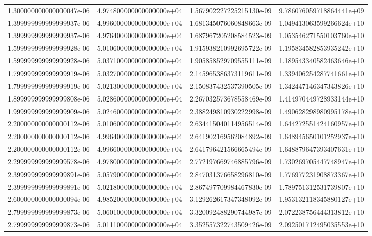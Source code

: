 \begin{table}
\begin{tabular}{S[scientific-notation=fixed,fixed-exponent = -6 ]@{\qquad} S[scientific-notation=fixed,fixed-exponent = 0, round-precision=0 ] S S[scientific-notation=fixed,fixed-exponent = 10 ]}
  1.300000000000000047e-06 & 4.974800000000000000e+04 & 1.567902227225215130e-09 & 9.786076059718864441e+09\\
  1.399999999999999937e-06 & 4.996000000000000000e+04 & 1.681345076060848663e-09 & 1.049413063599266624e+10\\
  1.399999999999999937e-06 & 4.976400000000000000e+04 & 1.687967205208584523e-09 & 1.053546271550103760e+10\\
  1.599999999999999928e-06 & 5.010600000000000000e+04 & 1.915938210992695722e-09 & 1.195834582853935242e+10\\
  1.599999999999999928e-06 & 5.037100000000000000e+04 & 1.905858529709555111e-09 & 1.189543340582463646e+10\\
  1.799999999999999919e-06 & 5.032700000000000000e+04 & 2.145965386373119611e-09 & 1.339406254287741661e+10\\
  1.799999999999999919e-06 & 5.021300000000000000e+04 & 2.150837432537390505e-09 & 1.342447146347343826e+10\\
  1.899999999999999808e-06 & 5.028600000000000000e+04 & 2.267032573678558469e-09 & 1.414970449728933144e+10\\
  1.999999999999999909e-06 & 5.024600000000000000e+04 & 2.388249810930222998e-09 & 1.490628298980995178e+10\\
  2.200000000000000112e-06 & 5.010600000000000000e+04 & 2.634415040114956514e-09 & 1.644272551424160957e+10\\
  2.200000000000000112e-06 & 4.996400000000000000e+04 & 2.641902169562084892e-09 & 1.648945650101252937e+10\\
  2.200000000000000112e-06 & 4.996600000000000000e+04 & 2.641796421566665494e-09 & 1.648879647393407631e+10\\
  2.299999999999999578e-06 & 4.978000000000000000e+04 & 2.772197669746885796e-09 & 1.730269705447748947e+10\\
  2.399999999999999891e-06 & 5.057900000000000000e+04 & 2.847031376658296810e-09 & 1.776977231908873367e+10\\
  2.399999999999999891e-06 & 5.021800000000000000e+04 & 2.867497709984467830e-09 & 1.789751312531739807e+10\\
  2.600000000000000094e-06 & 4.985200000000000000e+04 & 3.129262617347348092e-09 & 1.953132118345880127e+10\\
  2.799999999999999873e-06 & 5.060100000000000000e+04 & 3.320092488290744987e-09 & 2.072238756444313812e+10\\
  2.799999999999999873e-06 & 5.011100000000000000e+04 & 3.352557322743509426e-09 & 2.092501712495035553e+10\\

\end{tabular}
\end{table}
